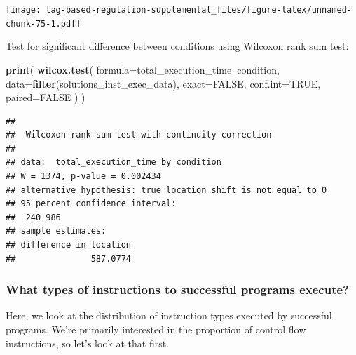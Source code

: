 \documentclass[]{book}
\newenvironment{Shaded}{\begin{snugshade}}{\end{snugshade}}
\newcommand{\DataTypeTok}[1]{\textcolor[rgb]{0.13,0.29,0.53}{#1}}
\newcommand{\KeywordTok}[1]{\textcolor[rgb]{0.13,0.29,0.53}{\textbf{#1}}}
\newcommand{\NormalTok}[1]{#1}
\newcommand{\OperatorTok}[1]{\textcolor[rgb]{0.81,0.36,0.00}{\textbf{#1}}}
\newcommand{\OtherTok}[1]{\textcolor[rgb]{0.56,0.35,0.01}{#1}}
\begin{document}
\texttt{[image: tag-based-regulation-supplemental\_files/figure-latex/unnamed-chunk-75-1.pdf]}

Test for significant difference between conditions using Wilcoxon rank sum test:

\begin{Shaded}
\begin{Highlighting}[]
\KeywordTok{print}\NormalTok{(}
  \KeywordTok{wilcox.test}\NormalTok{(}
    \DataTypeTok{formula=}\NormalTok{total_execution_time}\OperatorTok{~}\NormalTok{condition,}
    \DataTypeTok{data=}\KeywordTok{filter}\NormalTok{(solutions_inst_exec_data),}
    \DataTypeTok{exact=}\OtherTok{FALSE}\NormalTok{,}
    \DataTypeTok{conf.int=}\OtherTok{TRUE}\NormalTok{,}
    \DataTypeTok{paired=}\OtherTok{FALSE}
\NormalTok{  )}
\NormalTok{)}
\end{Highlighting}
\end{Shaded}

\begin{verbatim}
## 
##  Wilcoxon rank sum test with continuity correction
## 
## data:  total_execution_time by condition
## W = 1374, p-value = 0.002434
## alternative hypothesis: true location shift is not equal to 0
## 95 percent confidence interval:
##  240 986
## sample estimates:
## difference in location 
##               587.0774
\end{verbatim}

\hypertarget{what-types-of-instructions-to-successful-programs-execute-1}{%
\subsubsection{What types of instructions to successful programs execute?}\label{what-types-of-instructions-to-successful-programs-execute-1}}

Here, we look at the distribution of instruction types executed by successful programs.
We're primarily interested in the proportion of control flow instructions, so let's look at that first.
\end{document}
